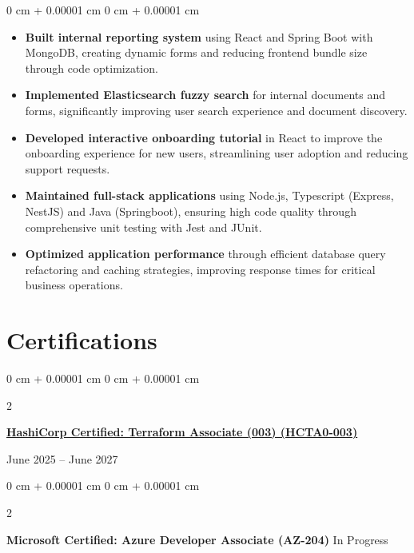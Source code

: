 \documentclass[11pt, letterpaper]{article}
\newenvironment{highlights}{
\begin{itemize}[
topsep=0.10 cm,
parsep=0.10 cm,
partopsep=0pt,
itemsep=0pt,
leftmargin=0 cm + 20pt
]
}{
\end{itemize}
} %
\newenvironment{onecolentry}{
\begin{adjustwidth}{
0 cm + 0.00001 cm
}{
0 cm + 0.00001 cm
}
}{
\end{adjustwidth}
} %
\newenvironment{twocolentry}[2][]{
\onecolentry
\def\secondColumn{#2}
\setcolumnwidth{\fill, 4.5 cm}
\begin{paracol}{2}
}{
\switchcolumn \raggedleft \secondColumn
\end{paracol}
\endonecolentry
} %
\let\hrefWithoutArrow\href
\begin{document}
\vspace{0.10 cm}
\begin{onecolentry}
\begin{highlights}
\item \textbf{Built internal reporting system} using React and Spring Boot with MongoDB, creating dynamic forms and reducing frontend bundle size through code optimization.
\vspace{0.05 cm}

\item \textbf{Implemented Elasticsearch fuzzy search} for internal documents and forms, significantly improving user search experience and document discovery.
\vspace{0.05 cm}
\item \textbf{Developed interactive onboarding tutorial} in React to improve the onboarding experience for new users, streamlining user adoption and reducing support requests.
\vspace{0.05 cm}

\item \textbf{Maintained full-stack applications} using Node.js, Typescript (Express, NestJS) and Java (Springboot), ensuring high code quality through comprehensive unit testing with Jest and JUnit.
\vspace{0.05 cm}

\item \textbf{Optimized application performance} through efficient database query refactoring and caching strategies, improving response times for critical business operations.
\end{highlights}
\end{onecolentry}

\section{Certifications} 

\begin{twocolentry}{
June 2025 – June 2027

}
\hrefWithoutArrow{https://www.credly.com/badges/c2c2db13-a312-48b3-b4b2-e720b3b13c7b/linked_in_profile}{\textbf{HashiCorp Certified: Terraform Associate (003) (HCTA0-003)}}
\end{twocolentry}

\vspace{0.10 cm}

\begin{twocolentry}{
In Progress
}
\textbf{Microsoft Certified: Azure Developer Associate (AZ-204)}\end{twocolentry}
\end{document}
